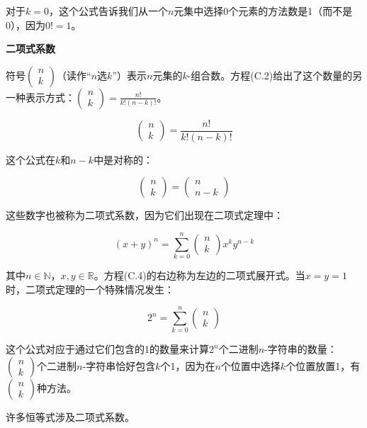 \documentclass[lang=cn,newtx,10pt,scheme=chinese]{elegantbook}
\begin{document}
对于$k=0$，这个公式告诉我们从一个$n$元集中选择0个元素的方法数是1（而不是0），因为$0 !=1$。

\textbf{二项式系数}

符号$(\begin{array}{l}n \\ k\end{array})$（读作“$n$选$k$”）表示$n$元集的$k$-组合数。方程(C.2)给出了这个数量的另一种表示方式：$(\begin{array}{l}n \\ k\end{array})=\frac{n !}{k !(n-k) !}$。

$$
(\begin{array}{l}
n \\
k
\end{array})=\frac{n !}{k !(n-k) !}
$$

这个公式在$k$和$n-k$中是对称的：

$$
(\begin{array}{l}
n \\
k
\end{array})=(\begin{array}{c}
n \\
n-k
\end{array})
$$

这些数字也被称为二项式系数，因为它们出现在二项式定理中：

$$
(x+y)^n=\sum_{k=0}^n(\begin{array}{l}
n \\
k
\end{array}) x^k y^{n-k}
$$

其中$n \in \mathbb{N}$，$x, y \in \mathbb{R}$。方程(C.4)的右边称为左边的二项式展开式。当$x=y=1$时，二项式定理的一个特殊情况发生：

$$
2^n=\sum_{k=0}^n(\begin{array}{l}
n \\
k
\end{array})
$$

这个公式对应于通过它们包含的1的数量来计算$2^n$个二进制$n$-字符串的数量：$(\begin{array}{l}n \\ k\end{array})$个二进制$n$-字符串恰好包含$k$个1，因为在$n$个位置中选择$k$个位置放置1，有$(\begin{array}{l}n \\ k\end{array})$种方法。

许多恒等式涉及二项式系数。
\end{document}

